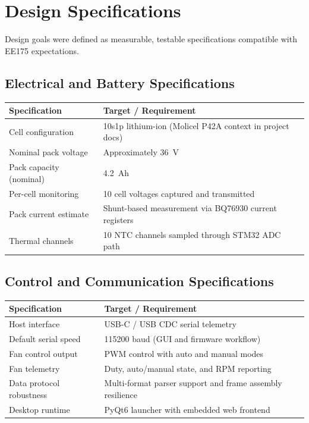 \documentclass[12pt]{article}
\begin{document}
\section{Design Specifications}

Design goals were defined as measurable, testable specifications compatible with EE175 expectations.

\subsection{Electrical and Battery Specifications}
\begin{longtable}{p{5cm}p{9cm}}
\toprule
\textbf{Specification} & \textbf{Target / Requirement} \\
\midrule
Cell configuration & 10s1p lithium-ion (Molicel P42A context in project docs) \\
Nominal pack voltage & Approximately \SI{36}{V} \\
Pack capacity (nominal) & \SI{4.2}{Ah} \\
Per-cell monitoring & 10 cell voltages captured and transmitted \\
Pack current estimate & Shunt-based measurement via BQ76930 current registers \\
Thermal channels & 10 NTC channels sampled through STM32 ADC path \\
\bottomrule
\end{longtable}

\subsection{Control and Communication Specifications}
\begin{longtable}{p{5cm}p{9cm}}
\toprule
\textbf{Specification} & \textbf{Target / Requirement} \\
\midrule
Host interface & USB-C / USB CDC serial telemetry \\
Default serial speed & 115200 baud (GUI and firmware workflow) \\
Fan control output & PWM control with auto and manual modes \\
Fan telemetry & Duty, auto/manual state, and RPM reporting \\
Data protocol robustness & Multi-format parser support and frame assembly resilience \\
Desktop runtime & PyQt6 launcher with embedded web frontend \\
\bottomrule
\end{longtable}
\end{document}

